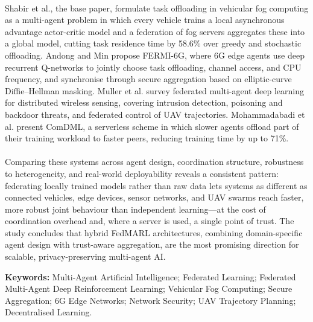 \documentclass[12pt,a4paper,final]{extreport}
\begin{document}
\paragraph{} Shabir et al., the base paper, formulate task offloading in vehicular fog computing as a multi-agent problem in which every vehicle trains a local asynchronous advantage actor-critic model and a federation of fog servers aggregates these into a global model, cutting task residence time by 58.6\% over greedy and stochastic offloading. Andong and Min propose FERMI-6G, where 6G edge agents use deep recurrent Q-networks to jointly choose task offloading, channel access, and CPU frequency, and synchronise through secure aggregation based on elliptic-curve Diffie--Hellman masking. Muller et al. survey federated multi-agent deep learning for distributed wireless sensing, covering intrusion detection, poisoning and backdoor threats, and federated control of UAV trajectories. Mohammadabadi et al. present ComDML, a serverless scheme in which slower agents offload part of their training workload to faster peers, reducing training time by up to 71\%.

\paragraph{} Comparing these systems across agent design, coordination structure, robustness to heterogeneity, and real-world deployability reveals a consistent pattern: federating locally trained models rather than raw data lets systems as different as connected vehicles, edge devices, sensor networks, and UAV swarms reach faster, more robust joint behaviour than independent learning---at the cost of coordination overhead and, where a server is used, a single point of trust. The study concludes that hybrid FedMARL architectures, combining domain-specific agent design with trust-aware aggregation, are the most promising direction for scalable, privacy-preserving multi-agent AI.

\vspace{0.5cm}
\noindent
\textbf{Keywords:} Multi-Agent Artificial Intelligence; Federated Learning; Federated Multi-Agent Deep Reinforcement Learning; Vehicular Fog Computing; Secure Aggregation; 6G Edge Networks; Network Security; UAV Trajectory Planning; Decentralised Learning.
\endgroup

\newpage

\thispagestyle{plain}
\begingroup
{}
\tableofcontents
\endgroup
\begingroup
{}
\listoffigures
{}
\listoftables
{}
\endgroup
\end{document}
